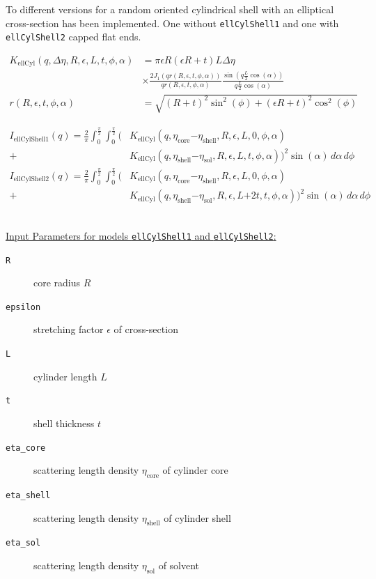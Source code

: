 To different versions for a random oriented cylindrical shell with
an elliptical cross-section has been implemented. One without
\texttt{ellCylShell1} and one with \texttt{ellCylShell2} capped flat
ends.

\begin{align}
K_\text{ellCyl}(q,\Delta\eta,R,\epsilon,L,t,\phi,\alpha) &= \pi \epsilon R(\epsilon R+t) L
\Delta \eta \\
    & \times \frac{2J_1\left(q r(R,\epsilon,t,\phi,\alpha) \right)}{q r(R,\epsilon,t,\phi,\alpha)}
    \frac{\sin(q \frac{L}{2}\cos(\alpha))}{q\frac{L}{2}\cos(\alpha)} \nonumber \\
r(R,\epsilon,t,\phi,\alpha) &= \sqrt{(R+t)^2\sin^2(\phi)+(\epsilon R+t)^2\cos^2(\phi)}
\end{align}

\begin{align}
I_\text{ellCylShell1}(q) = \frac{2}{\pi}\int_0^{\frac{\pi}{2}} \!\! \int_0^{\frac{\pi}{2}} \biggl(
  &
  K_\text{ellCyl}\left(q,\eta_\text{core}\mathord-\eta_\text{shell},R,\epsilon,L,0,\phi,\alpha\right) \\
+&  K_\text{ellCyl}\left(q,\eta_\text{shell}\mathord-\eta_\text{sol},R,\epsilon,L,t,\phi,\alpha\right)
\biggr)^2 \sin(\alpha) \,d\alpha\, d\phi \nonumber \\
I_\text{ellCylShell2}(q) = \frac{2}{\pi}\int_0^{\frac{\pi}{2}} \!\!  \int_0^{\frac{\pi}{2}}  \biggl(
 &  K_\text{ellCyl}\left(q,\eta_\text{core}\mathord-\eta_\text{shell},R,\epsilon,L,0,\phi,\alpha\right) \\
+&  K_\text{ellCyl}\left(q,\eta_\text{shell}\mathord-\eta_\text{sol},R,\epsilon,L\mathord+2t,t,\phi,\alpha\right) \biggr)^2 \sin(\alpha) \,d\alpha \,d\phi  \nonumber
\end{align}


\vspace{5mm}

\hspace{1pt}\\
\uline{Input Parameters for models \texttt{ellCylShell1} and \texttt{ellCylShell2}:}\\
\begin{description}
\item[\texttt{R}] core radius $R$
\item[\texttt{epsilon}] stretching factor $\epsilon$ of cross-section
\item[\texttt{L}] cylinder length $L$
\item[\texttt{t}] shell thickness $t$
\item[\texttt{eta\_core}] scattering length density $\eta_\text{core}$ of cylinder core
\item[\texttt{eta\_shell}] scattering length density $\eta_\text{shell}$ of cylinder shell
\item[\texttt{eta\_sol}] scattering length density $\eta_\text{sol}$ of solvent
\end{description}

